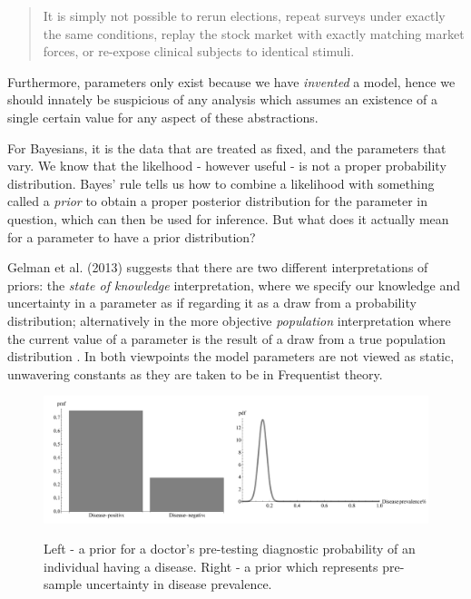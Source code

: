 \documentclass[11pt,fullpage]{book}
\begin{document}
\begin{quotation}
It is simply not possible to rerun elections, repeat surveys under exactly the same conditions, replay the stock market with exactly matching market forces, or re-expose clinical subjects to identical stimuli.
\end{quotation}

Furthermore, parameters only exist because we have \textit{invented} a model, hence we should innately be suspicious of any analysis which assumes an existence of a single certain value for any aspect of these abstractions.

For Bayesians, it is the data that are treated as fixed, and the parameters that vary. We know that the likelhood - however useful - is not a proper probability distribution. Bayes' rule tells us how to combine a likelihood with something called a \textit{prior} to obtain a proper posterior distribution for the parameter in question, which can then be used for inference. But what does it actually mean for a parameter to have a prior distribution?

Gelman et al. (2013) suggests that there are two different interpretations of priors: the \textit{state of knowledge} interpretation, where we specify our knowledge and uncertainty in a parameter as if regarding it as a draw from a probability distribution; alternatively in the more objective \textit{population} interpretation where the current value of a parameter is the result of a draw from a true population distribution \cite{gelman2013bayesian}. In both viewpoints the model parameters are not viewed as static, unwavering constants as they are taken to be in Frequentist theory.

\begin{figure}
\centering
\scalebox{0.3} 
{\includegraphics{Prior_introduction.pdf}}
\caption{Left - a prior for a doctor's pre-testing diagnostic probability of an individual having a disease. Right - a prior which represents pre-sample uncertainty in disease prevalence.}\label{fig:Prior_introduction}
\end{figure}
\end{document}
